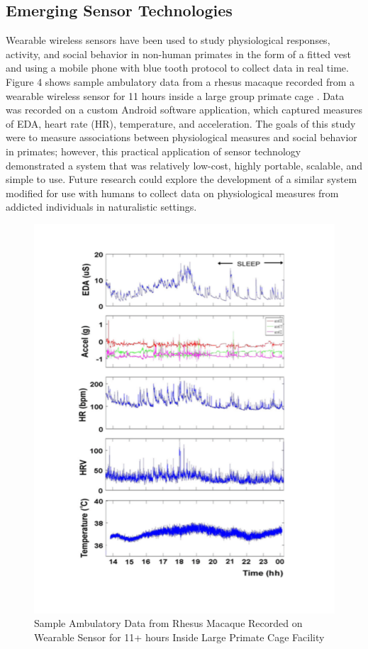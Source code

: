 \documentclass[sigconf]{acmart}
\begin{document}
\subsection{Emerging Sensor Technologies}

Wearable wireless sensors have been used to study physiological responses, 
activity, and social behavior in non-human primates in the form of a fitted 
vest and using a mobile phone with blue tooth protocol to collect data 
in real time. Figure 4 shows sample ambulatory data from a rhesus macaque
recorded from a wearable wireless sensor for 11 hours inside a large group 
primate cage \cite{fletcher12}. Data was recorded on a custom Android software 
application, which captured measures of EDA, heart rate (HR), temperature, and 
acceleration. The goals of this study were to measure associations between 
physiological measures and social behavior in primates; however, this practical 
application of sensor technology demonstrated a system that was relatively 
low-cost, highly portable, scalable, and simple to use. Future research could 
explore the development of a similar system modified for use with humans to 
collect data on physiological measures from addicted individuals in naturalistic 
settings. 

\begin{figure}[!ht]
  \centering\includegraphics[width=\columnwidth]{images/Figure4.pdf}
  \caption{Sample Ambulatory Data from Rhesus Macaque Recorded on 
  Wearable Sensor for 11+ hours Inside Large Primate Cage Facility 
  \cite{fletcher12}}
  \label{f:Figure4}
\end{figure}
\end{document}
